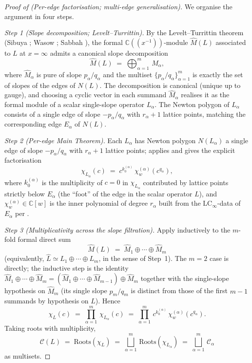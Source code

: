\documentclass[aip,jmp,preprint,amsmath,amssymb,nofootinbib,floatfix]{revtex4-2}
\theoremstyle{plain}
\theoremstyle{definition}
\theoremstyle{remark}
\newcommand{\LCinf}{\mathrm{LC}_\infty}
\newcommand{\Roots}{\mathrm{Roots}}
\newcommand{\Cl}{\mathcal{C}}
\begin{document}
\begin{proof}[Proof of  (Per-edge factorisation; multi-edge
generalisation)]
We organise the argument in four steps.

\smallskip
\textit{Step 1 (Slope decomposition; Levelt--Turrittin).}
By the Levelt--Turrittin theorem (Sibuya \cite{sibuya};
Wasow \cite[Ch.~VII]{wasow}; Sabbah \cite[Ch.~II,
Thm.~II.2.4]{sabbah-isomon}), the formal $\mathbb{C}((x^{-1}))$-module
$\widehat{M}(L)$ associated to $L$ at $x = \infty$ admits a canonical
slope decomposition
\[
   \widehat{M}(L) \;=\; \bigoplus_{\alpha=1}^{m}\,
   \widehat{M}_\alpha,
\]
where $\widehat{M}_\alpha$ is pure of slope $p_\alpha/q_\alpha$ and
the multiset $\{p_\alpha/q_\alpha\}_{\alpha=1}^{m}$ is exactly the set
of slopes of the edges of $N(L)$. The decomposition is canonical
(unique up to gauge), and choosing a cyclic vector in each summand
$\widehat{M}_\alpha$ realises it as the formal module of a scalar
single-slope operator $L_\alpha$. The Newton polygon of $L_\alpha$
consists of a single edge of slope $-p_\alpha/q_\alpha$ with
$r_\alpha + 1$ lattice points, matching the corresponding edge
$E_\alpha$ of $N(L)$.

\smallskip
\textit{Step 2 (Per-edge Main Theorem).}
Each $L_\alpha$ has Newton polygon $N(L_\alpha)$ a single edge of
slope $-p_\alpha/q_\alpha$ with $r_\alpha + 1$ lattice points;
 applies and gives the explicit factorisation
\[
   \chi_{L_\alpha}(c)
   \;=\;
   c^{k_0^{(\alpha)}}\, \chi_w^{(\alpha)}(c^{q_\alpha}),
\]
where $k_0^{(\alpha)}$ is the multiplicity of $c = 0$ in $\chi_{L_\alpha}$
contributed by lattice points strictly below $E_\alpha$ (the
``foot'' of the edge in the scalar operator $L$), and
$\chi_w^{(\alpha)} \in \mathbb{C}[w]$ is the inner polynomial of
degree $r_\alpha$ built from the $\LCinf$-data of $E_\alpha$ per
.

\smallskip
\textit{Step 3 (Multiplicativity across the slope filtration).}
Apply  inductively to the $m$-fold
formal direct sum
\[
   \widehat{M}(L) \;=\; \widehat{M}_1 \oplus \cdots \oplus \widehat{M}_m
\]
(equivalently, $\widehat{L} \simeq L_1 \oplus \cdots \oplus L_m$, in
the sense of Step~1). The $m = 2$ case is 
directly; the inductive step is the identity $\widehat{M}_1 \oplus
\cdots \oplus \widehat{M}_m = (\widehat{M}_1 \oplus \cdots \oplus
\widehat{M}_{m-1}) \oplus \widehat{M}_m$ together with the
single-slope hypothesis on $\widehat{M}_m$ (its single slope
$p_m/q_m$ is distinct from those of the first $m - 1$ summands by
hypothesis on $L$). Hence
\[
   \chi_L(c)
   \;=\;
   \prod_{\alpha=1}^{m}\, \chi_{L_\alpha}(c)
   \;=\;
   \prod_{\alpha=1}^{m}\,
   c^{k_0^{(\alpha)}}\, \chi_w^{(\alpha)}(c^{q_\alpha}).
\]
Taking roots with multiplicity,
\[
   \Cl(L) \;=\; \Roots(\chi_L)
   \;=\;
   \bigsqcup_{\alpha = 1}^{m}\, \Roots(\chi_{L_\alpha})
   \;=\;
   \bigsqcup_{\alpha = 1}^{m}\, \Cl_\alpha
\]
as multisets.


\end{proof}
\end{document}
